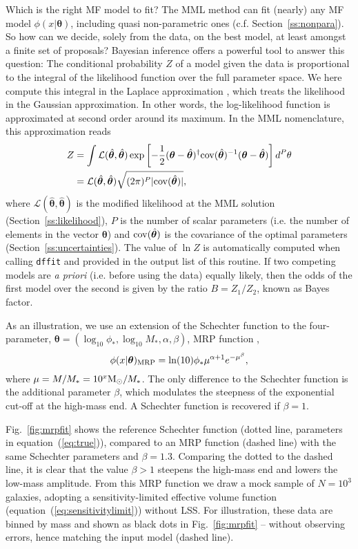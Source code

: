 \documentclass[a4paper,fleqn,usenatbib]{mnras}
\newcommand{\be}{\begin{equation}}
\newcommand{\ee}{\end{equation}}
\newcommand{\msun}{{\rm M}_{\odot}}
\renewcommand{\L}{\mathcal{L}}
\newcommand{\fig}[1]{Fig.~\ref{fig:#1}}
\newcommand{\eq}[1]{equation~(\ref{eq:#1})}
\renewcommand{\ss}[1]{Section~\ref{ss:#1}}
\newcommand{\ie}{i.e.\xspace}
\newcommand{\cf}{c.f.\xspace}
\newcommand{\cov}{{\rm cov}}
\newcommand{\para}{{\bm{\theta}}}
\begin{document}
Which is the right MF model to fit? The MML method can fit (nearly) any MF model $\phi(x|\para)$, including quasi non-parametric ones (\cf \ss{nonpara}). So how can we decide, solely from the data, on the best model, at least amongst a finite set of proposals? Bayesian inference offers a powerful tool to answer this question: The conditional probability $Z$ of a model given the data is proportional to the integral of the likelihood function over the full parameter space. We here compute this integral in the Laplace approximation \citep{Daniels1954}, which treats the likelihood in the Gaussian approximation. In other words, the log-likelihood function is approximated at second order around its maximum. In the MML nomenclature, this approximation reads
%
\be\begin{split}
	Z & = \int \L(\hat\para,\hat\para)\exp\left[-\frac{1}{2}(\para-\hat\para)^\dag\cov(\hat\para)^{-1}(\para-\hat\para)\right]d^P\theta\\
	& = \L(\hat\para,\hat\para) \sqrt{(2\pi)^P|\cov(\hat\para)|},
\end{split}
\ee
%
where $\L(\hat\para,\hat\para)$ is the modified likelihood at the MML solution (\ss{likelihood}), $P$ is the number of scalar parameters (\ie the number of elements in the vector $\para$) and $\cov(\hat\para)$ is the covariance of the optimal parameters (\ss{uncertainties}). The value of $\ln Z$ is automatically computed when calling \texttt{dffit} and provided in the output list of this routine. If two competing models are \emph{a priori} (\ie before using the data) equally likely, then the odds of the first model over the second is given by the ratio $B=Z_1/Z_2$, known as Bayes factor.

As an illustration, we use an extension of the Schechter function to the four-parameter, $\para=(\log_{10}\phi_\ast,\log_{10}M_\ast,\alpha,\beta)$, MRP function \citep{Murray2017},
%
\be
	\phi(x|\para)_{\rm MRP} = \ln(10)\phi_\ast\mu^{\alpha+1}e^{-\mu^\beta},
\ee
%
where $\mu= M/M_\ast=10^x\msun/M_\ast$. The only difference to the Schechter function is the additional parameter $\beta$, which modulates the steepness of the exponential cut-off at the high-mass end. A Schechter function is recovered if $\beta=1$.

\fig{mrpfit} shows the reference Schechter function (dotted line, parameters in \eq{true}), compared to an MRP function (dashed line) with the same Schechter parameters and $\beta=1.3$. Comparing the dotted to the dashed line, it is clear that the value $\beta>1$ steepens the high-mass end and lowers the low-mass amplitude. From this MRP function we draw a mock sample of $N=10^3$ galaxies, adopting a sensitivity-limited effective volume function (\eq{sensitivitylimit}) without LSS. For illustration, these data are binned by mass and shown as black dots in \fig{mrpfit} -- without observing errors, hence matching the input model (dashed line).
\end{document}
